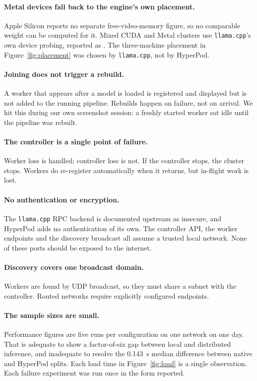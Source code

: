 \paragraph{Metal devices fall back to the engine's own placement.}
Apple Silicon reports no separate free-video-memory figure, so no comparable
weight can be computed for it. Mixed CUDA and Metal clusters use
\texttt{llama.cpp}'s own device probing, reported as
. The three-machine placement in
Figure~\ref{fig:placement} was chosen by \texttt{llama.cpp}, not by HyperPod.

\paragraph{Joining does not trigger a rebuild.}
A worker that appears after a model is loaded is registered and displayed but is
not added to the running pipeline. Rebuilds happen on failure, not on arrival.
We hit this during our own screenshot session: a freshly started worker sat idle
until the pipeline was rebuilt.

\paragraph{The controller is a single point of failure.}
Worker loss is handled; controller loss is not. If the controller stops, the
cluster stops. Workers do re-register automatically when it returns, but
in-flight work is lost.

\paragraph{No authentication or encryption.}
The \texttt{llama.cpp} RPC backend is documented upstream as insecure, and
HyperPod adds no authentication of its own. The controller API, the worker
endpoints and the discovery broadcast all assume a trusted local network. None
of these ports should be exposed to the internet.

\paragraph{Discovery covers one broadcast domain.}
Workers are found by UDP broadcast, so they must share a subnet with the
controller. Routed networks require explicitly configured endpoints.

\paragraph{The sample sizes are small.}
Performance figures are five runs per configuration on one network on one day.
That is adequate to show a factor-of-six gap between local and distributed
inference, and inadequate to resolve the \SI{0.143}{\second} median difference
between native and HyperPod splits. Each load time in
Figure~\ref{fig:load} is a single observation. Each failure experiment was run
once in the form reported.
